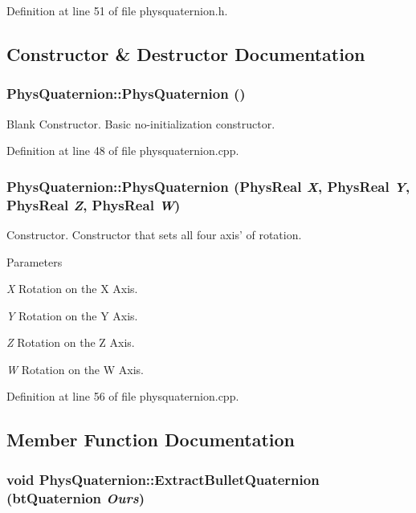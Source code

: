 Definition at line 51 of file physquaternion.h.

\subsection{Constructor \& Destructor Documentation}
\hypertarget{classPhysQuaternion_afa90934d42b3a55d4b06bcf4c076123b}{
\subsubsection[{PhysQuaternion}]{\setlength{\rightskip}{0pt plus 5cm}PhysQuaternion::PhysQuaternion ()}}
\label{d5/d19/classPhysQuaternion_afa90934d42b3a55d4b06bcf4c076123b}


Blank Constructor. Basic no-\/initialization constructor. 

Definition at line 48 of file physquaternion.cpp.\hypertarget{classPhysQuaternion_aa0cbd53e7a9e624a3f0f22aa94618e17}{
\subsubsection[{PhysQuaternion}]{\setlength{\rightskip}{0pt plus 5cm}PhysQuaternion::PhysQuaternion (PhysReal {\em X}, \/  PhysReal {\em Y}, \/  PhysReal {\em Z}, \/  PhysReal {\em W})}}
\label{d5/d19/classPhysQuaternion_aa0cbd53e7a9e624a3f0f22aa94618e17}


Constructor. Constructor that sets all four axis' of rotation. 
\begin{DoxyParams}{Parameters}
\item[{\em X}]Rotation on the X Axis. \item[{\em Y}]Rotation on the Y Axis. \item[{\em Z}]Rotation on the Z Axis. \item[{\em W}]Rotation on the W Axis. \end{DoxyParams}


Definition at line 56 of file physquaternion.cpp.

\subsection{Member Function Documentation}
\hypertarget{classPhysQuaternion_a112b979d18c915cb719781949d74ff83}{
\subsubsection[{ExtractBulletQuaternion}]{\setlength{\rightskip}{0pt plus 5cm}void PhysQuaternion::ExtractBulletQuaternion (btQuaternion {\em Ours})}}
\label{d5/d19/classPhysQuaternion_a112b979d18c915cb719781949d74ff83}



